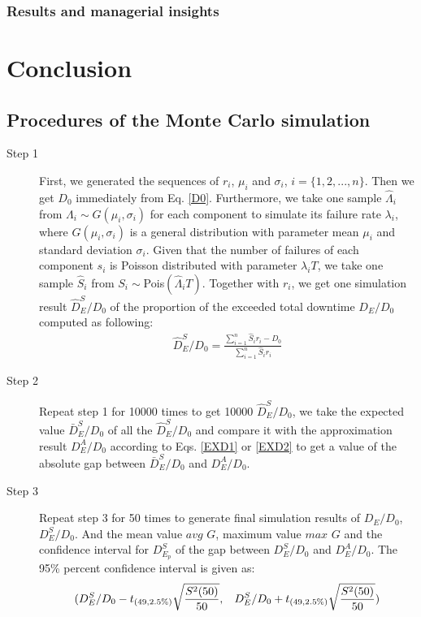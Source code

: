 \documentclass[preprint,12pt]{elsarticle}
\begin{document}
\subsubsection{Results and managerial insights}

\section{Conclusion}
\newpage
\begin{appendices}


\section{Procedures of the Monte Carlo simulation}
\label{MCP}
\begin{description}
\item[Step 1]
First, we generated the sequences of $r_{i}$, $\mu_{i}$ and $\sigma_{i}$, $i=\{1,2,...,n\}$. Then we get $D_0$ immediately from Eq. \eqref{D0}. Furthermore, we take one sample $\hat{\Lambda}_{i}$ from $\Lambda_{i} \sim G(\mu_{i},\sigma_{i})$ for each component to simulate its failure rate $\lambda_{i}$, where $G(\mu_{i},\sigma_{i})$ is a general distribution with parameter mean $\mu_{i}$ and standard deviation $\sigma_{i}$. Given that the number of failures of each component $s_{i}$ is Poisson distributed with parameter $\lambda_{i}T$, we take one sample $\hat{S}_{i}$ from $S_{i}\sim$Pois$(\hat{\Lambda}_{i}T)$. Together with $r_{i}$, we get one simulation result $\hat{D}_{E}^{S}/D_{0}$ of the proportion of the exceeded total downtime $D_{E}/D_0$ computed as following:
\begin{eqnarray}
\hat{D}_{E}^{S}/D_{0}=\frac{\sum_{i=1}^{n}{\hat{S}_{i}r_{i}}-D_0}{\sum_{i=1}^{n}{\hat{S}_{i}r_{i}}}
\end{eqnarray}

\item[Step 2]

Repeat step 1 for 10000 times to get 10000 $\hat{D}_{E}^{S}/D_{0}$, we take the expected value $\bar{D}_{E}^{S}/D_{0}$ of all the $\hat{D}_{E}^{S}/D_{0}$ and compare it with the approximation result $D_{E}^{A}/D_{0}$ according to Eqs. \eqref{EXD1} or \eqref{EXD2}  to get a value of the absolute gap between $\bar{D}_{E}^{S}/D_{0}$ and $D_{E}^{A}/D_{0}$.

\item[Step 3]

Repeat step 3 for 50 times to generate final simulation results of $D_{E}/D_{0}$, $D_{E}^{S}/D_{0}$. And the mean value $avg$ $G$, maximum value $max$ $G$ and the confidence interval for $D_{E_{p}}^{S}$ of the gap between $D_{E}^{S}/D_{0}$ and $D_{E}^{A}/D_{0}$. The 95\% percent confidence interval is given as:
$$(D_{E}^{S}/D_{0}-t_{(49,2.5\%)}\sqrt{\frac{S^{2}(50)}{50}},\hspace{3mm}D_{E}^{S}/D_{0}+t_{(49,2.5\%)}\sqrt{\frac{S^{2}(50)}{50}} ) $$


\end{description}
\end{appendices}
\end{document}
